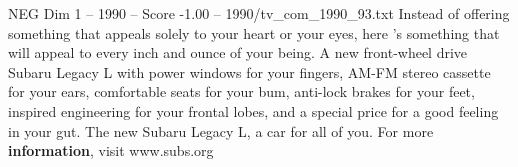 \begin{textsample}{NEG Dim 1 – 1990 – Score -1.00 – 1990/tv\_com\_1990\_93.txt}  \label{ex:f1_neg_047}
Instead of offering something that appeals solely to your heart or your eyes, here 's something that will appeal to every inch and ounce of your being.
A new front-wheel drive Subaru Legacy L with power windows for your fingers, AM-FM stereo cassette for your ears, comfortable seats for your bum, anti-lock brakes for your feet, inspired engineering for your frontal lobes, and a special price for a good feeling in your gut.
The new Subaru Legacy L, a car for all of you.
For more \textbf{information}, visit www.subs.org

\end{textsample}
